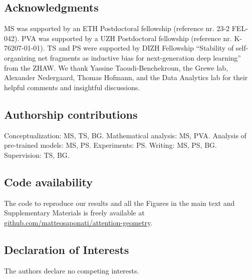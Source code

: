 \documentclass[11pt,twocolumn]{article}
\theoremstyle{plain}
\theoremstyle{definition}
\theoremstyle{remark}
\begin{document}
\subsection*{Acknowledgments}
%
MS was supported by an ETH Postdoctoral fellowship (reference nr. 23-2 FEL-042). 
%
PVA was supported by a UZH Postdoctoral fellowship (reference nr. K-76207-01-01).
%
TS and PS were supported by DIZH Fellowship ``Stability of self-organizing net fragments as inductive bias for next-generation deep learning'' from the ZHAW.
%
We thank Yassine Taoudi-Benchekroun, the Grewe lab, Alexander Nedergaard, Thomas Hofmann, and the Data Analytics lab for their helpful comments and insightful discussions.\\
%
\subsection*{Authorship contributions}
%
Conceptualization: MS, TS, BG. 
%
Mathematical analysis: MS, PVA. 
%
Analysis of pre-trained models: MS, PS.
%
Experiments: PS. 
%
Writing: MS, PS, BG. 
%
Supervision: TS, BG. 
%

\subsection*{Code availability}
%
The code to reproduce our results and all the Figures in the main text and Supplementary Materials is freely available at \href{https://github.com/matteosaponati/attention-geometry}{github.com/matteosaponati/attention-geometry}.
%
%
\subsection*{Declaration of Interests}
%
The authors declare no competing interests.




\newpage 

\setcounter{section}{0}
\setcounter{subsection}{0}
\setcounter{equation}{0}
\setcounter{figure}{0}
\setcounter{table}{0}
\setcounter{footnote}{0}

\makeatletter
\renewcommand{\thesection}{S\arabic{section}}
\renewcommand{\thesubsection}{S\arabic{section}.\arabic{subsection}}
\renewcommand{\theequation}{S\arabic{equation}}
\renewcommand{\thefigure}{S\arabic{figure}}
\renewcommand{\thetable}{S\arabic{table}}

\renewcommand{\theHsection}{S\arabic{section}}
\renewcommand{\theHsubsection}{S\arabic{section}.\arabic{subsection}}
\end{document}
